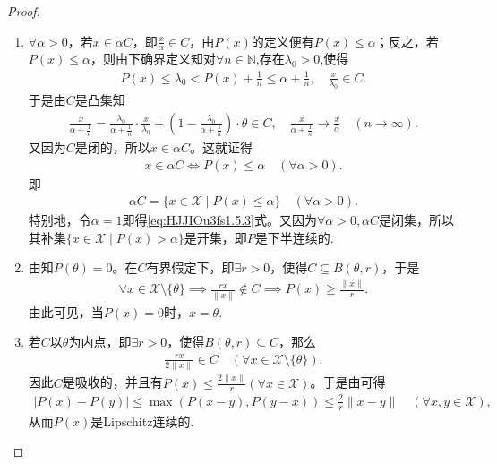 \documentclass[../../main.tex]{subfiles}%
\begin{document}
\begin{proof}
\begin{enumerate}[(1)]
\item $\forall \alpha > 0$，若$x \in \alpha C$，即$\frac{x}{\alpha} \in C$，由$P(x)$的定义便有$P(x) \leqslant \alpha$；反之，若$P(x) \leqslant \alpha$，则由下确界定义知对$\forall n \in \mathbb{N}$,存在$\lambda_0>0$,使得
\begin{align*}
P\left( x \right) \leqslant \lambda _0<P\left( x \right) +\frac{1}{n}\leqslant \alpha +\frac{1}{n},\quad \frac{x}{\lambda _0}\in C.
\end{align*}
于是由$C$是凸集知
\begin{align*}
\frac{x}{\alpha +\frac{1}{n}}=\frac{\lambda _0}{\alpha +\frac{1}{n}}\cdot \frac{x}{\lambda _0}+\left( 1-\frac{\lambda _0}{\alpha +\frac{1}{n}} \right) \cdot \theta \in C,\quad \frac{x}{\alpha +\frac{1}{n}}\rightarrow \frac{x}{\alpha}\quad (n\rightarrow \infty ).
\end{align*}
又因为$C$是闭的，所以$x \in \alpha C$。这就证得
\begin{align*}
x\in \alpha C\iff P(x)\leqslant \alpha\quad (\forall \alpha >0).
\end{align*}
即
\begin{align*}
\alpha C = \{ x \in \mathscr{X} \mid P(x) \leqslant \alpha \} \quad (\forall \alpha > 0). 
\end{align*}
特别地，令$\alpha = 1$即得\eqref{eq:HJJIOu3fs1.5.3}式。又因为$\forall \alpha > 0, \alpha C$是闭集，所以其补集$\{x\in \mathscr{X}\mid P(x)>\alpha\}$是开集，即$P$是下半连续的.

\item 由知$P(\theta) = 0$。在$C$有界假定下，即$\exists r > 0$，使得$C \subseteq B(\theta, r)$，于是
\begin{align*}
\forall x \in \mathscr{X} \setminus \{\theta\} \implies \frac{rx}{\|x\|} \notin C \implies P(x) \geqslant \frac{\|x\|}{r}.
\end{align*}
由此可见，当$P(x) = 0$时，$x = \theta$.
\item 若$C$以$\theta$为内点，即$\exists r > 0$，使得$B(\theta, r) \subseteq C$，那么
\begin{align*}
\frac{rx}{2\|x\|} \in C \quad (\forall x \in \mathscr{X} \setminus \{\theta\}).
\end{align*}
因此$C$是吸收的，并且有$P(x) \leqslant \frac{2\|x\|}{r} (\forall x \in \mathscr{X})$。于是由可得
\begin{align*}
|P(x) - P(y)| \leqslant \max(P(x - y), P(y - x)) \leqslant \frac{2}{r} \|x - y\| \quad (\forall x, y \in \mathscr{X}),
\end{align*}
从而$P(x)$是Lipschitz连续的.
\end{enumerate}

\end{proof}
\end{document}
